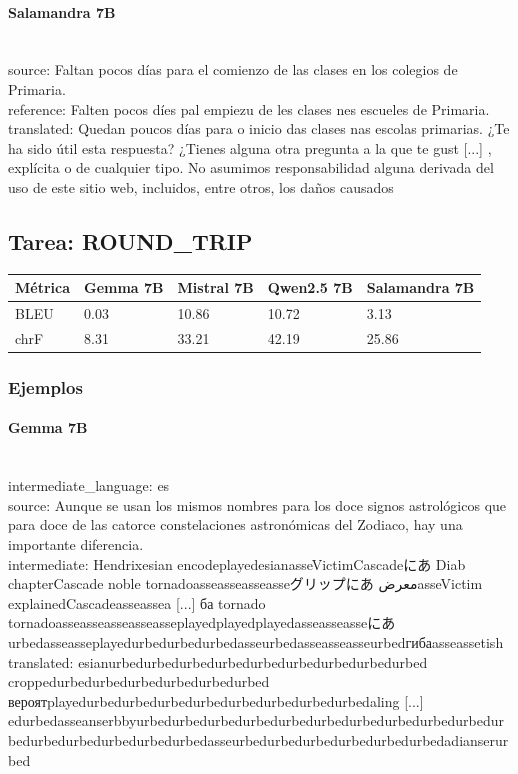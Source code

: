\paragraph{Salamandra 7B}~\\
{source:} Faltan pocos días para el comienzo de las clases en los colegios de Primaria.\\
{reference:} Falten pocos díes pal empiezu de les clases nes escueles de Primaria.\\
{translated:} Quedan poucos días para o inicio das clases nas escolas primarias.  ¿Te ha sido útil esta respuesta? ¿Tienes alguna otra pregunta a la que te gust [...] , explícita o de cualquier tipo. No asumimos responsabilidad alguna derivada del uso de este sitio web, incluidos, entre otros, los daños causados\\

\subsection{Tarea: ROUND\_TRIP}\label{tarea-round_trip}
{\def\LTcaptype{none}
\begin{longtable}[]{@{}lllll@{}}
\toprule\noalign{}
Métrica & Gemma 7B & Mistral 7B & Qwen2.5 7B & Salamandra 7B \\
\midrule\noalign{}
\endhead
\bottomrule\noalign{}
\endlastfoot
BLEU & 0.03 & 10.86 & 10.72 & 3.13 \\
chrF & 8.31 & 33.21 & 42.19 & 25.86 \\
\end{longtable}}

\subsubsection{Ejemplos}

\paragraph{Gemma 7B}~\\
{intermediate\_language:} es\\
{source:} Aunque se usan los mismos nombres para los doce signos astrológicos que para doce de las catorce constelaciones astronómicas del Zodiaco, hay una importante diferencia.\\
{intermediate:} Hendrixesian encodeplayedesianasseVictimCascadeにあ Diab chapterCascade noble tornadoasseasseasseasseグリップにあ معرضasseVictim explainedCascadeasseassea [...] ба tornado tornadoasseasseasseasseasseplayedplayedplayedasseasseasseにあurbedasseasseplayedurbedurbedurbedasseurbedasseasseasseurbedгибаasseassetish\\
{translated:} esianurbedurbedurbedurbedurbedurbedurbedurbedurbed croppedurbedurbedurbedurbedurbedurbed вероятplayedurbedurbedurbedurbedurbedurbedurbedurbedaling [...] edurbedasseanserbbyurbedurbedurbedurbedurbedurbedurbedurbedurbedurbedurbedurbedurbedurbedurbedurbedasseurbedurbedurbedurbedurbedurbedadianserurbed\\

